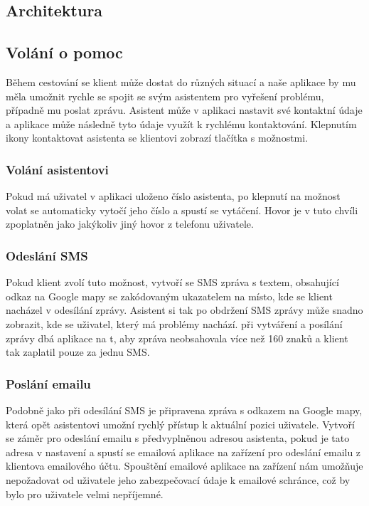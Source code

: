 \documentclass{article}
\begin{document}
\subsection{Architektura}

\subsection{Volání o pomoc}
Během cestování se klient může dostat do různých situací a naše aplikace by mu měla umožnit rychle se
spojit se svým asistentem pro vyřešení problému, případně mu poslat zprávu. Asistent může v aplikaci nastavit své kontaktní
údaje a aplikace může následně tyto údaje využít k rychlému kontaktování. Klepnutím ikony kontaktovat
asistenta se klientovi zobrazí tlačítka s možnostmi.

\subsubsection{Volání asistentovi}
Pokud má uživatel v aplikaci uloženo číslo asistenta, po klepnutí na možnost volat se automaticky
vytočí jeho číslo a spustí se vytáčení. Hovor je v tuto chvíli zpoplatněn jako jakýkoliv jiný hovor
z telefonu uživatele.

\subsubsection{Odeslání SMS}
Pokud klient zvolí tuto možnost, vytvoří se SMS zpráva s textem, obsahující odkaz na Google mapy
se zakódovaným ukazatelem na místo, kde se klient nacházel v odesílání zprávy. Asistent si tak po obdržení
SMS zprávy může snadno zobrazit, kde se uživatel, který má problémy nachází. při vytváření a posílání zprávy
dbá aplikace na t, aby zpráva neobsahovala více než 160 znaků a klient tak zaplatil pouze za jednu SMS.

\subsubsection{Poslání emailu}
Podobně jako při odesílání SMS je připravena zpráva s odkazem na Google mapy, která opět asistentovi
umožní rychlý přístup k aktuální pozici uživatele. Vytvoří se záměr pro odeslání emailu s předvyplněnou
adresou asistenta, pokud je tato adresa v nastavení a spustí se emailová aplikace na zařízení pro odeslání
emailu z klientova emailového účtu. Spouštění emailové aplikace na zařízení nám umožňuje nepožadovat
od uživatele jeho zabezpečovací údaje k emailové schránce, což by bylo pro uživatele velmi nepříjemné.
\end{document}

